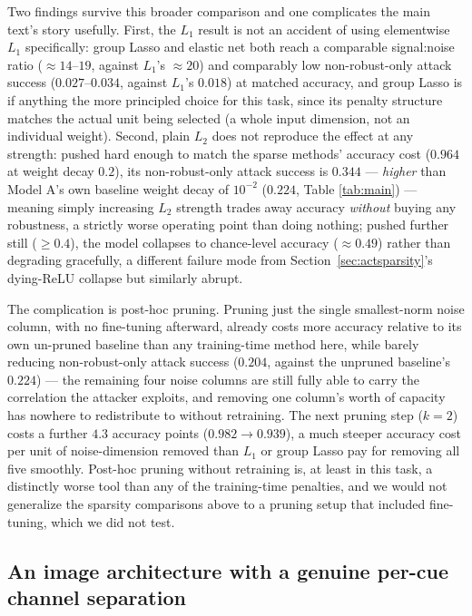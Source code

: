 \documentclass[11pt]{article}
\begin{document}
Two findings survive this broader comparison and one complicates the main
text's story usefully. First, the $L_1$ result is not an accident of
using elementwise $L_1$ specifically: group Lasso and elastic net both
reach a comparable signal:noise ratio ($\approx 14$--$19$, against
$L_1$'s $\approx 20$) and comparably low non-robust-only attack success
($0.027$--$0.034$, against $L_1$'s $0.018$) at matched accuracy, and
group Lasso is if anything the more principled choice for this task,
since its penalty structure matches the actual unit being selected (a
whole input dimension, not an individual weight). Second, plain $L_2$
does not reproduce the effect at any strength: pushed hard enough to
match the sparse methods' accuracy cost ($0.964$ at weight decay $0.2$),
its non-robust-only attack success is $0.344$ --- \emph{higher} than
Model A's own baseline weight decay of $10^{-2}$ ($0.224$, Table
\ref{tab:main}) --- meaning simply increasing $L_2$ strength trades away
accuracy \emph{without} buying any robustness, a strictly worse operating
point than doing nothing; pushed further still ($\ge 0.4$), the model
collapses to chance-level accuracy ($\approx 0.49$) rather than
degrading gracefully, a different failure mode from
Section~\ref{sec:actsparsity}'s dying-ReLU collapse but similarly abrupt.

The complication is post-hoc pruning. Pruning just the single
smallest-norm noise column, with no fine-tuning afterward, already costs
more accuracy relative to its own un-pruned baseline than any training-time
method here, while barely reducing non-robust-only attack success
($0.204$, against the unpruned baseline's $0.224$) --- the remaining four
noise columns are still fully able to carry the correlation the attacker
exploits, and removing one column's worth of capacity has nowhere to
redistribute to without retraining. The next pruning step ($k=2$) costs a
further $4.3$ accuracy points ($0.982 \to 0.939$), a much steeper
accuracy cost per unit of noise-dimension removed than $L_1$ or group
Lasso pay for removing all five smoothly. Post-hoc pruning without
retraining is, at least in this task, a distinctly worse tool than any of
the training-time penalties, and we would not generalize the sparsity
comparisons above to a pruning setup that included fine-tuning, which we
did not test.

\subsection{An image architecture with a genuine per-cue channel
separation}
\label{app:twobranch}
\end{document}
